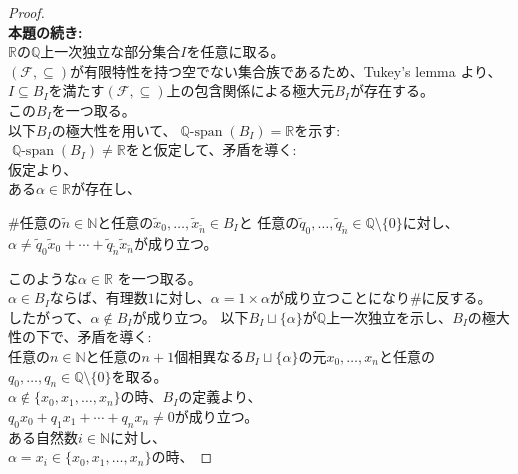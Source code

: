 \documentclass{jreport}
\newenvironment{claimproof}[1]{\par\noindent\underline{Proof:}\space#1}{\hfill $\square$}
\DeclareMathOperator{\spn}{\mathbb{Q}-span}
\begin{document}
\begin{proof}
	\\
	\textbf{本題の続き:}\\
	$\mathbb{R}$の$\mathbb{Q}$上一次独立な部分集合$I$を任意に取る。\\
	$(\mathcal{F},\subseteq )$が有限特性を持つ空でない集合族であるため、Tukey's lemma より、\\
	$I \subseteq B_I$を満たす$(\mathcal{F},\subseteq )$上の包含関係による極大元$B_I$が存在する。\\
	この$B_I$を一つ取る。\\
	以下$B_I$の極大性を用いて、$\spn{(B_I)} =\mathbb{R}$を示す:\\
	$\spn{(B_I)} \neq \mathbb{R}$をと仮定して、矛盾を導く:\\
	仮定より、\\
	ある$\alpha \in \mathbb{R}$が存在し、
	\begin{framed}
		\#任意の$\tilde{n} \in \mathbb{N}$と任意の$\tilde{x}_0,\ldots,\tilde{x}_{\tilde{n}} \in B_I$と
		任意の$\tilde{q}_0,\ldots,\tilde{q}_{\tilde{n}} \in \mathbb{Q} \setminus \{0\} $に対し、
	$\alpha \neq \tilde{q}_0 \tilde{x}_0 +\cdots+\tilde{q}_{\tilde{n}} \tilde{x}_{\tilde{n}}$が成り立つ。\\
	\end{framed}
	このような$\alpha \in \mathbb{R}$ を一つ取る。\\
	$\alpha \in B_I$ならば、有理数$1$に対し、$\alpha = 1 \times \alpha$が成り立つことになり\#に反する。\\
	したがって、$\alpha \notin B_I$が成り立つ。
	以下$B_I\sqcup \{\alpha\}$が$\mathbb{Q}$上一次独立を示し、$B_I$の極大性の下で、矛盾を導く:\\
	任意の$n \in \mathbb{N}$と任意の$n+1$個相異なる$B_I\sqcup \{\alpha\}$の元$x_0,\ldots,x_n$と任意の$q_0,\ldots,q_n \in \mathbb{Q} \setminus \{0\}$を取る。\\
	$\alpha \notin \{x_0,x_1,\ldots,x_n\}$の時、$B_I$の定義より、\\
	$q_0x_0+q_1x_1+\cdots+q_nx_n \neq 0$が成り立つ。\\
	ある自然数$i \in \mathbb{N}$に対し、\\
	$\alpha =x_i \in \{x_0,x_1,\ldots,x_n\}$の時、

\end{proof}
\end{document}
